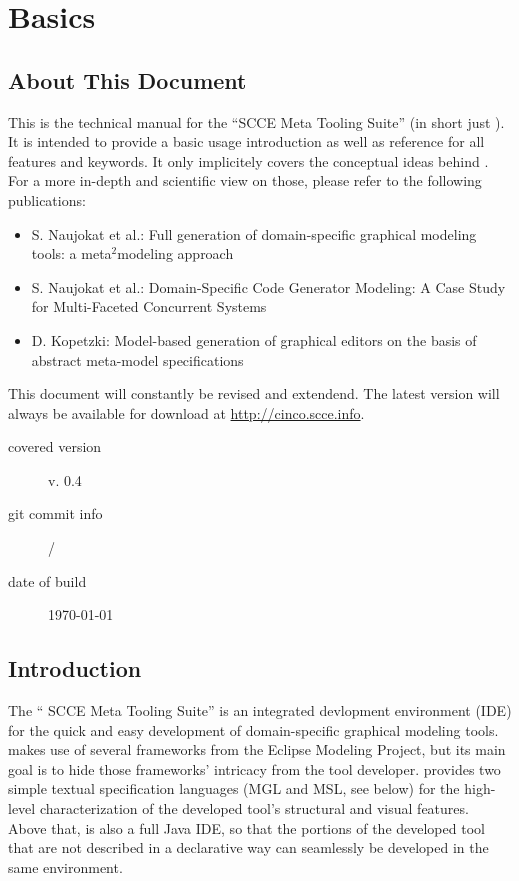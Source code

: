 \documentclass[a4paper,american,12pt]{scrreprt}
\begin{document}
\chapter{Basics}

\section{About This Document}

This is the technical manual for the ``\cinco SCCE Meta Tooling Suite'' (in
short just \cinco). It is intended to provide a basic usage introduction as
well as reference for all features and keywords. It only implicitely covers the
conceptual ideas behind \cinco. For a more in-depth and scientific view on those,
please refer to the following publications:
%
\begin{itemize}
\item S. Naujokat et al.: Full generation of domain-specific graphical modeling tools: a
meta$^2$modeling approach \cite{NaLSKM2014}
\item S. Naujokat et al.: Domain-Specific Code Generator Modeling: A Case Study for
Multi-Faceted Concurrent Systems \cite{NaTISL2014}
\item D. Kopetzki: Model-based generation of graphical editors on
the basis of abstract meta-model specifications \cite{Kopetz2014}
\end{itemize}

This document will constantly be revised and extendend. The latest version will
always be available for download at \url{http://cinco.scce.info}. 

\begin{description}
\item[covered version] \cinco v. 0.4
\item[git commit info] \gitAbbrevHash{} / \gitAuthorDate
\item[date of build] \today
\end{description}

\section{Introduction}

The ``\cinco{} SCCE Meta Tooling Suite'' is an integrated devlopment environment
(IDE) for the quick and easy development of domain-specific graphical modeling
tools. \cinco{} makes use of several frameworks from the Eclipse Modeling
Project, but its main goal is to hide those frameworks' intricacy from the
tool developer. \cinco{} provides two simple textual specification languages (MGL and
MSL, see below) for the high-level characterization of the developed tool's
structural and visual features. Above that, \cinco{} is also a full Java IDE, so
that the portions of the developed tool that are not described in a declarative
way can seamlessly be developed in the same environment.
\end{document}
